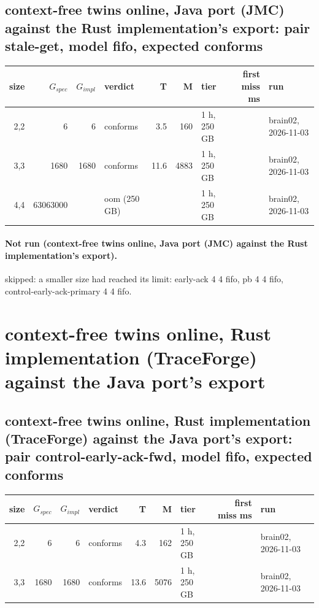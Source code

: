 \documentclass[10pt]{article}
\begin{document}
\subsection*{context-free twins online, Java port (JMC) against the Rust implementation's export: pair \textsf{stale-get}, model fifo, expected conforms}
\begin{longtable}{@{}rrrlrrlrl@{}}
\toprule
size & $G_{\mathit{spec}}$ & $G_{\mathit{impl}}$ & verdict & T & M & tier & first miss ms & run \\
\midrule
\endhead
\color{red} 2,2 & 6 & 6 & conforms & 3.5 & 160 & 1 h, 250 GB &  & brain02, 2026-11-03 \\
\color{red} 3,3 & 1680 & 1680 & conforms & 11.6 & 4883 & 1 h, 250 GB &  & brain02, 2026-11-03 \\
\color{red} 4,4 & 63063000 &  & oom (250 GB) &  &  & 1 h, 250 GB &  & brain02, 2026-11-03 \\
\bottomrule
\end{longtable}
\paragraph{Not run (context-free twins online, Java port (JMC) against the Rust implementation's export).}
skipped: a smaller size had reached its limit: early-ack 4 4 fifo, pb 4 4 fifo, control-early-ack-primary 4 4 fifo.\par
\section*{context-free twins online, Rust implementation (TraceForge) against the Java port's export}
\subsection*{context-free twins online, Rust implementation (TraceForge) against the Java port's export: pair \textsf{control-early-ack-fwd}, model fifo, expected conforms}
\begin{longtable}{@{}rrrlrrlrl@{}}
\toprule
size & $G_{\mathit{spec}}$ & $G_{\mathit{impl}}$ & verdict & T & M & tier & first miss ms & run \\
\midrule
\endhead
\color{red} 2,2 & 6 & 6 & conforms & 4.3 & 162 & 1 h, 250 GB &  & brain02, 2026-11-03 \\
\color{red} 3,3 & 1680 & 1680 & conforms & 13.6 & 5076 & 1 h, 250 GB &  & brain02, 2026-11-03 \\
\bottomrule
\end{longtable}
\end{document}
